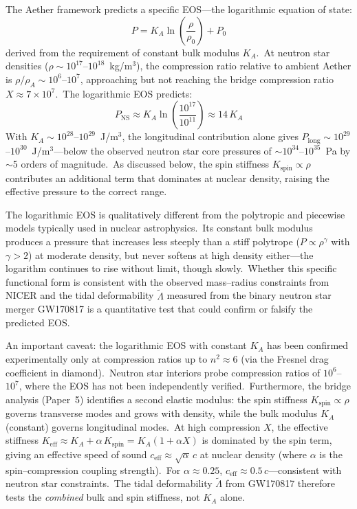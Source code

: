 ﻿\documentclass[12pt,letterpaper]{article}
\newcommand{\rhoa}{\rho_{\!A}}
\newcommand{\Ka}{K_{\!A}}
\begin{document}
The Aether framework predicts a specific EOS---the logarithmic equation of state:
%
\begin{equation}
  P = \Ka \ln\!\left(\frac{\rho}{\rho_0}\right) + P_0
\end{equation}
%
derived from the requirement of constant bulk modulus $\Ka$.\ At neutron star
densities ($\rho \sim 10^{17}$--$10^{18}$~kg/m$^3$), the compression ratio
relative to ambient Aether is $\rho/\rhoa \sim 10^6$--$10^7$, approaching but
not reaching the bridge compression ratio $X \approx 7 \times 10^7$.\ The
logarithmic EOS predicts:
%
\begin{equation}
  P_{\mathrm{NS}} \approx \Ka \ln\!\left(\frac{10^{17}}{10^{11}}\right)
    \approx 14\,\Ka
\end{equation}
%
With $\Ka \sim 10^{28}$--$10^{29}$~J/m$^3$, the longitudinal contribution
alone gives $P_{\mathrm{long}} \sim 10^{29}$--$10^{30}$~J/m$^3$---below the
observed neutron star core pressures of $\sim$$10^{34}$--$10^{35}$~Pa by
$\sim$5 orders of magnitude.\ As discussed below, the spin stiffness
$K_{\mathrm{spin}} \propto \rho$ contributes an additional term that
dominates at nuclear density, raising the effective pressure to the correct
range.

The logarithmic EOS is qualitatively different from the polytropic and piecewise
models typically used in nuclear astrophysics.\ Its constant bulk modulus
produces a pressure that increases less steeply than a stiff polytrope
($P \propto \rho^\gamma$ with $\gamma > 2$) at moderate density, but never
softens at high density either---the logarithm continues to rise without limit,
though slowly.\ Whether this specific functional form is consistent with the
observed mass--radius constraints from NICER and the tidal deformability
$\tilde{\Lambda}$ measured from the binary neutron star merger GW170817
\cite{ligo2017gw170817} is a quantitative test that could confirm or falsify
the predicted EOS.

An important caveat: the logarithmic EOS with constant $\Ka$ has been confirmed
experimentally only at compression ratios up to $n^2 \approx 6$ (via the Fresnel
drag coefficient in diamond).\ Neutron star interiors probe compression ratios
of $10^6$--$10^7$, where the EOS has not been independently verified.\
Furthermore, the bridge analysis (Paper~5) identifies a second elastic modulus:
the spin stiffness $K_{\mathrm{spin}} \propto \rho$ governs transverse modes
and grows with density, while the bulk modulus $\Ka$ (constant) governs
longitudinal modes.\ At high compression $X$, the effective stiffness
$K_{\mathrm{eff}} \approx \Ka + \alpha\,K_{\mathrm{spin}} = \Ka(1 + \alpha X)$
is dominated by the spin term, giving an effective speed of sound
$c_{\mathrm{eff}} \approx \sqrt{\alpha}\,c$ at nuclear density
(where $\alpha$ is the spin--compression coupling strength).\ For
$\alpha \approx 0.25$, $c_{\mathrm{eff}} \approx 0.5\,c$---consistent with
neutron star constraints.\ The tidal deformability $\tilde{\Lambda}$ from
GW170817 therefore tests the \emph{combined} bulk and spin stiffness, not
$\Ka$ alone.
\end{document}
